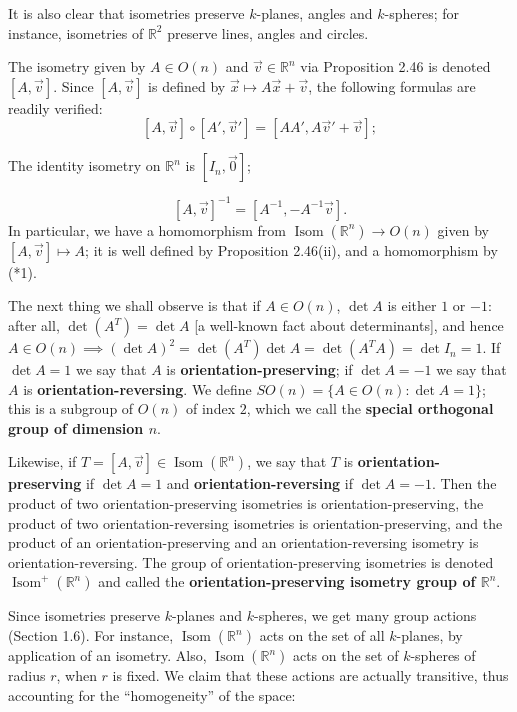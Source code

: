 \documentclass[leqno]{book}
\begin{document}
It is also clear that isometries preserve $k$-planes, angles and $k$-spheres; for instance, isometries of $\mathbb R^2$ preserve lines, angles and circles.

The isometry given by $A\in O(n)$ and $\vec v\in\mathbb R^n$ via Proposition 2.46 is denoted $[A,\vec v]$.  Since $[A,\vec v]$ is defined by $\vec x\mapsto A\vec x+\vec v$, the following formulas are readily verified:
\begin{equation}\tag{*1}[A,\vec v]\circ[A',\vec v']=[AA',A\vec v'+\vec v];\end{equation}
\begin{center}
The identity isometry on $\mathbb R^n$ is $[I_n,\vec 0]$;
\end{center}
$$[A,\vec v]^{-1}=[A^{-1},-A^{-1}\vec v].$$
In particular, we have a homomorphism from $\operatorname{Isom}(\mathbb R^n)\to O(n)$ given by $[A,\vec v]\mapsto A$; it is well defined by Proposition 2.46(ii), and a homomorphism by (*1).

The next thing we shall observe is that if $A\in O(n)$, $\det A$ is either $1$ or $-1$: after all, $\det(A^T)=\det A$ [a well-known fact about determinants], and hence $A\in O(n)\implies(\det A)^2=\det(A^T)\det A=\det(A^TA)=\det I_n=1$.  If $\det A=1$ we say that $A$ is \textbf{orientation-preserving}; if $\det A=-1$ we say that $A$ is \textbf{orientation-reversing}.  We define $SO(n)=\{A\in O(n):\det A=1\}$; this is a subgroup of $O(n)$ of index $2$, which we call the \textbf{special orthogonal group of dimension $n$}.

Likewise, if $T=[A,\vec v]\in\operatorname{Isom}(\mathbb R^n)$, we say that $T$ is \textbf{orientation-preserving} if $\det A=1$ and \textbf{orientation-reversing} if $\det A=-1$.  Then the product of two orientation-preserving isometries is orientation-preserving, the product of two orientation-reversing isometries is orientation-preserving, and the product of an orientation-preserving and an orientation-reversing isometry is orientation-reversing.  The group of orientation-preserving isometries is denoted $\operatorname{Isom}^+(\mathbb R^n)$ and called the \textbf{orientation-preserving isometry group of $\mathbb R^n$}.

Since isometries preserve $k$-planes and $k$-spheres, we get many group actions (Section 1.6).  For instance, $\operatorname{Isom}(\mathbb R^n)$ acts on the set of all $k$-planes, by application of an isometry.  Also, $\operatorname{Isom}(\mathbb R^n)$ acts on the set of $k$-spheres of radius $r$, when $r$ is fixed.  We claim that these actions are actually transitive, thus accounting for the ``homogeneity'' of the space:\\
\end{document}
